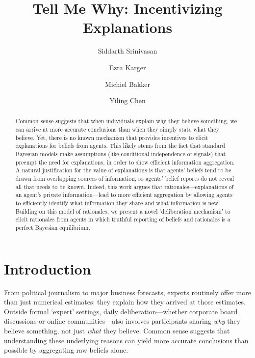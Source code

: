 \documentclass{winnower}
\begin{document}
\title{Tell Me Why: Incentivizing Explanations}

\author{Siddarth Srinivasan}
\author{Ezra Karger}
\author{Michiel Bakker}
\author{Yiling Chen}

\date{}

\maketitle

\begin{abstract}
Common sense suggests that when individuals explain why they believe something, we can arrive at more accurate conclusions than when they simply state what they believe.  Yet, there is no known mechanism that provides incentives to elicit explanations for beliefs from agents. This likely stems from the fact that standard Bayesian models make assumptions (like conditional independence of signals) that preempt the need for explanations, in order to show efficient information aggregation.  A natural justification for the value of explanations is that agents' beliefs tend to be drawn from overlapping sources of information, so agents' belief reports do not reveal all that needs to be known. Indeed, this work argues that rationales—explanations of an agent’s private information—lead to more efficient aggregation by allowing agents to efficiently identify what information they share and what information is new. Building on this model of rationales, we present a novel `deliberation mechanism' to elicit rationales from agents in which truthful reporting of beliefs and rationales is a perfect Bayesian equilibrium. 

\end{abstract}

\section{Introduction}
From political journalism to major business forecasts, experts routinely offer more than just numerical estimates: they explain how they arrived at those estimates. Outside formal `expert' settings, daily deliberation—whether corporate board discussions or online communities—also involves participants sharing \emph{why} they believe something, not just \emph{what} they believe. Common sense suggests that understanding these underlying reasons can yield more accurate conclusions than possible by aggregating raw beliefs alone.
\end{document}
